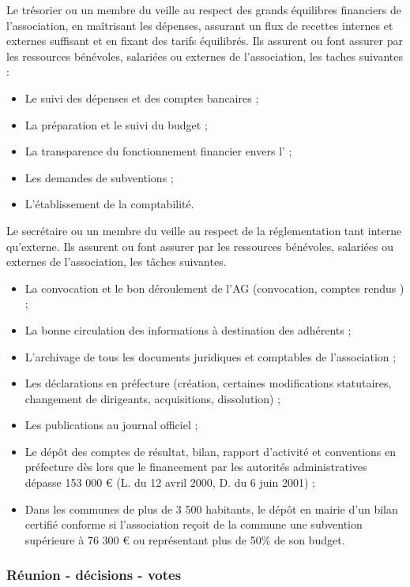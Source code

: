 \documentclass[a4paper,french,10pt]{article}
\begin{document}
Le trésorier ou un membre du \bureau{} veille au respect des grands équilibres financiers de
l’association, en maîtrisant les dépenses, assurant un flux de
recettes internes et externes suffisant et en fixant des tarifs
équilibrés. Ils assurent ou font assurer par les ressources bénévoles,
salariées ou externes de l’association, les taches suivantes :
\begin{itemize}
\item Le suivi des dépenses et des comptes bancaires ;
\item La préparation et le suivi du budget ;
\item La transparence du fonctionnement financier envers l’\AG{} ;
\item Les demandes de subventions ;
\item L’établissement de la comptabilité.
\end{itemize}

Le secrétaire ou un membre du \bureau{} veille au respect de la réglementation tant interne
qu’externe. Ils assurent ou font assurer par les ressources bénévoles,
salariées ou externes de l’association, les tâches suivantes.
\begin{itemize}
\item La convocation et le bon déroulement de l’AG (convocation, comptes rendus ) ;
\item La bonne circulation des informations à destination des adhérents ;
\item L’archivage de tous les documents juridiques et comptables de l’association ;
\item Les déclarations en préfecture (création, certaines modifications statutaires, changement de dirigeants, acquisitions, dissolution) ;
\item Les publications au journal officiel ;
\item Le dépôt des comptes de résultat, bilan, rapport d’activité et conventions en préfecture dès lors que le financement par les autorités administratives dépasse 153 000 \euro{} (L. du 12 avril 2000, D. du 6 juin 2001) ;
\item Dans les communes de plus de 3 500 habitants, le dépôt en mairie d’un bilan certifié conforme si l’association reçoit de la commune une subvention supérieure à 76 300 \euro{} ou représentant plus de 50\% de son budget.
\end{itemize}

\subsubsection{Réunion - décisions - votes}
\label{sec:reun-decis-votes}
\end{document}
